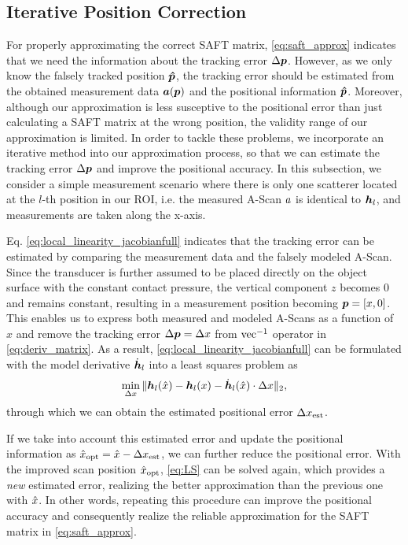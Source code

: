 \subsection{Iterative Position Correction} \label{sec:iterative_GD}
For properly approximating the correct SAFT matrix, \eqref{eq:saft_approx} indicates that we need the information about the tracking error $\Delta \bm{p}$. However, as we only know the falsely tracked position $\bm{\hat{p}}$, the tracking error should be estimated from the obtained measurement data $\bm{a} (\bm{p})$ and the positional information $\bm{\hat{p}}$. Moreover, although our approximation is less susceptive to the positional error than just calculating a SAFT matrix at the wrong position, the validity range of our approximation is limited. In order to tackle these problems, we incorporate an iterative method into our approximation process, so that we can estimate the tracking error $\Delta \bm{p}$ and improve the positional accuracy. In this subsection, we consider a simple measurement scenario where there is only one scatterer located at the $l$-th position in our ROI, i.e. the measured A-Scan $a$ is identical to $\bm{h}_{l}$, and measurements are taken along the x-axis.\par

Eq. \eqref{eq:local_linearity_jacobianfull} indicates that the tracking error can be estimated by comparing the measurement data and the falsely modeled A-Scan. Since the transducer is further assumed to be placed directly on the object surface with the constant contact pressure, the vertical component $z$ becomes 0 and remains constant, resulting in a measurement position becoming $\bm{p} = [x, 0]$. This enables us to express both measured and modeled A-Scans as a function of $x$ and remove the tracking error $\Delta \bm{p} = \Delta x$ from $\operatorname{vec}^{-1}$ operator in \eqref{eq:deriv_matrix}. As a result, \eqref{eq:local_linearity_jacobianfull} can be formulated with the model derivative $\dot{\bm{h}}_{l}$ into a least squares problem as
\begin{equation} \label{eq:LS}
\min_{\xdelta} \| \SAFTcol (\xhat) - \SAFTcol (x) - \SAFTcoldot (\xhat) \cdot \xdelta \|_{2},
\end{equation}
through which we can obtain the estimated positional error $\Delta x_{\operatorname{est}}$. \par

If we take into account this estimated error and update the positional information as $\hat{x}_{\operatorname{opt}} = \hat{x} - \Delta x_{\operatorname{est}}$, we can further reduce the positional error. With the improved scan position $\hat{x}_{\operatorname{opt}}$, \eqref{eq:LS} can be solved again, which provides a \textit{new} estimated error, realizing the better approximation than the previous one with $\hat{x}$. In other words, repeating this procedure can improve the positional accuracy and consequently realize the reliable approximation for the SAFT matrix in \eqref{eq:saft_approx}. \par

